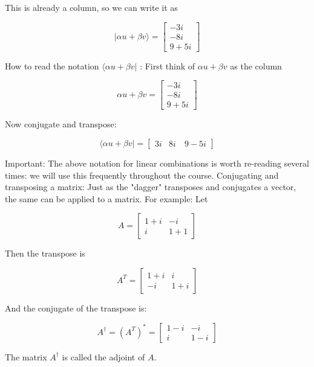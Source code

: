 \documentclass[main.tex]{subfiles}
\begin{document}
    This is already a column, so we can write it as

    $$
    |\alpha u+\beta v\rangle=\left[\begin{array}{r}
    -3 i \\
    -8 i \\
    9+5 i
    \end{array}\right]
    $$
    
    How to read the notation $\langle\alpha u+\beta v|$ : First think of $\alpha u+\beta v$ as the column
    
    $$
    \alpha u+\beta v=\left[\begin{array}{r}
    -3 i \\
    -8 i \\
    9+5 i
    \end{array}\right]
    $$
    
    Now conjugate and transpose:
    
    $$
    \langle\alpha u+\beta v|=\left[\begin{array}{lll}
    3 i & 8 i \quad 9-5 i
    \end{array}\right]
    $$
    
    Important: The above notation for linear combinations is worth re-reading several times: we will use this frequently throughout the course. Conjugating and transposing a matrix: Just as the "dagger" transposes and conjugates a vector, the same can be applied to a matrix. For example: Let
    
    $$
    A=\left[\begin{array}{cc}
    1+i & -i \\
    i & 1+1
    \end{array}\right]
    $$
    
    Then the transpose is
    
    $$
    A^{T}=\left[\begin{array}{cc}
    1+i & i \\
    -i & 1+i
    \end{array}\right]
    $$
    
    And the conjugate of the transpose is:
    
    $$
    A^{\dagger}=\left(A^{T}\right)^{*}=\left[\begin{array}{cc}
    1-i & -i \\
    i & 1-i
    \end{array}\right]
    $$
    
    The matrix $A^{\dagger}$ is called the adjoint of $A$.
    
\end{document}
